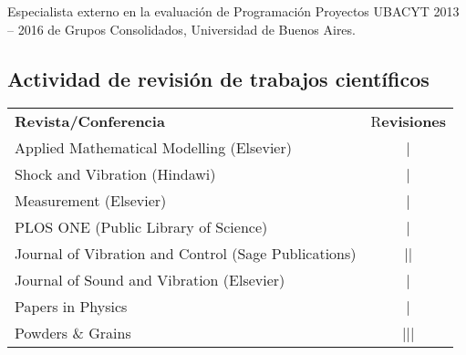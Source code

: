  Especialista externo en la evaluación de Programación Proyectos UBACYT 2013 -- 2016 de Grupos Consolidados, Universidad de Buenos Aires.

\subsection{Actividad de revisión de trabajos científicos}
\begin{tabular}{l c}
    \textbf{Revista/Conferencia} & R\textbf{evisiones} \\
    Applied Mathematical Modelling (Elsevier) & | \\ 
    Shock and Vibration (Hindawi) &  | \\
    Measurement (Elsevier) &  | \\
    PLOS ONE (Public Library of Science) & | \\
    Journal of Vibration and Control (Sage Publications) & || \\
    Journal of Sound and Vibration (Elsevier) & \cancel{||||} | \\
    Papers in Physics & | \\
    Powders \& Grains & ||| \\
\end{tabular}

